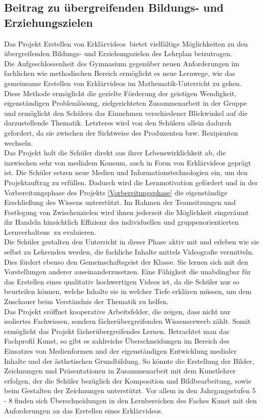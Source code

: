 \documentclass[a4paper,12pt,twoside=false]{scrartcl}
\begin{document}
\subsection{Beitrag zu übergreifenden Bildungs- und Erziehungszielen}
Das Projekt \glqq Erstellen von Erklärvideos\grqq$~$ bietet vielfältige Möglichkeiten zu den übergreifenden Bildungs- und Erziehungszielen des Lehrplan beizutragen. \\
Die Aufgeschlossenheit des Gymnasium gegenüber neuen Anforderungen im fachlichen wie methodischen Bereich ermöglicht es neue Lernwege, wie das gemeinsame Erstellen von Erklärvideos im Mathematik-Unterricht zu gehen.\\
Diese Methode ermöglicht die gezielte Förderung der geistigen Wendigkeit, eigenständigen Problemlösung, zielgerichteten Zusammenarbeit in der Gruppe und ermöglicht den Schülern das Einnehmen verschiedener Blickwinkel auf die darzustellende Thematik. Letzteres wird von den Schülern allein dadurch gefordert, da sie zwischen der Sichtweise des Produzenten bzw. Rezipienten wechseln. \cite{LehrplanPlusBildungsziele}\\
Das Projekt holt die Schüler direkt aus ihrer Lebenswirklichkeit ab, die inzwischen sehr von medialem Konsum, auch in Form von Erklärvideos \cite{jim16} geprägt ist. Die Schüler setzen neue Medien und Informationstechnologien ein, um den Projektauftrag  zu erfüllen. Dadurch wird die Lernmotivation gefördert und in der Vorbereitungsphase des Projekts \ref{Vorbereitungsphase} die eigenständige Erschließung des Wissens unterstützt. Im Rahmen der Teamsitzungen und Festlegung von Zwischenzielen wird ihnen jederzeit die Möglichkeit eingeräumt ihr Handeln hinsichtlich \glqq Effizienz des individuellen und gruppenorientierten Lernverhaltens\grqq $~$ \cite{LehrplanPlusBildungsziele} zu evaluieren.\\
Die Schüler gestalten den Unterricht in dieser Phase aktiv mit und erleben wie sie selbst zu Lehrenden werden, die fachliche Inhalte mittels Videografie vermitteln. Dies fördert ebenso den Gemeinschaftsgeist der Klasse. Sie lernen sich mit den Vorstellungen anderer auseinanderzusetzen. Eine Fähigkeit die unabdingbar für das Erstellen eines qualitativ hochwertigen Videos ist, da die Schüler nur so beurteilen können, welche Inhalte sie in welcher Tiefe erklären müssen, um dem Zuschauer beim Verständnis der Thematik zu helfen. \\
Das Projekt eröffnet kooperative Arbeitsfelder, die zeigen, dass nicht nur isoliertes Fachwissen, sondern fächerübergreifenden Wissenserwerb zählt. Somit ermöglicht das Projekt fächerübergreifendes Lernen. Betrachtet man das Fachprofil Kunst, so gibt es zahlreiche Überschneidungen im Bereich des Einsatzes von Medienformen und der eigenständigen Entwicklung medialer Inhalte und der ästhetischen Grundbildung. So könnte die Erstellung der Bilder, Zeichnungen und Präsentationen in Zusammenarbeit mit dem Kunstlehrer erfolgen, der die Schüler bezüglich der Komposition und Bildbearbeitung, sowie beim Gestalten der Zeichnungen unterstützt. Vor allem in den Jahrgangsstufen 5 - 8 finden sich Überschneidungen in den Lernbereichen des Faches Kunst mit den Anforderungen an das Erstellen eines Erklärvideos. 
\end{document}
